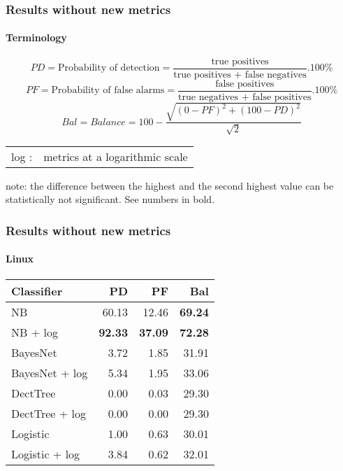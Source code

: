 \begin{frame}
 \frametitle{Results without new metrics}
 \framesubtitle{Terminology}
 $$PD = \text{Probability of detection} = \frac{\text{true positives}}{\text{true positives + false negatives}} . 100\%$$
 \vspace{0.1cm}
 $$PF = \text{Probability of false alarms} = \frac{\text{false positives}}{\text{true negatives + false positives}} . 100\%$$
 \vspace{0.1cm}
 $$Bal = Balance = 100 - \frac{\sqrt{(0-PF)^2 + (100-PD)^2}}{\sqrt{2}}$$
 \begin{center}
  \begin{tabular}{ll}
   log : & metrics at a logarithmic scale
  \end{tabular}
 \end{center}
 \small note: the difference between the highest and the second highest value can be statistically not significant. See numbers in bold. \normalsize
\end{frame}

\begin{frame}
 \frametitle{Results without new metrics}%
 \framesubtitle{Linux}
 \begin{center}
 \begin{tabular}{lrrr}
  \hspace{0.2cm} Classifier & PD & PF & Bal\\
  \hline
  NB & 60.13 & 12.46 & \textbf{69.24}\\
  NB + log &  \textbf{92.33} & \textbf{37.09} & \textbf{72.28}\\
  BayesNet & 3.72 & 1.85 & 31.91\\
  BayesNet + log & 5.34 & 1.95 & 33.06\\
  DectTree & 0.00 & 0.03 & 29.30\\
  DectTree + log & 0.00 & 0.00 & 29.30\\
  Logistic & 1.00 & 0.63 & 30.01\\
  Logistic + log & 3.84 & 0.62 & 32.01\\
  \hline
 \end{tabular}
 \end{center}
\end{frame}

